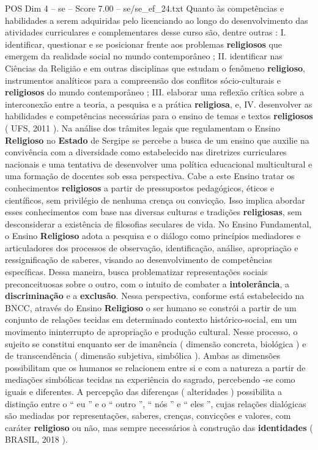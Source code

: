 \begin{textsample}{POS Dim 4 – se – Score 7.00 – se/se\_ef\_24.txt}
Quanto às competências e habilidades a serem adquiridas pelo licenciando ao longo do desenvolvimento das atividades curriculares e complementares desse curso são, dentre outras : I. identificar, questionar e se posicionar frente aos problemas \textbf{religiosos} que emergem da realidade social no mundo contemporâneo ; II. identificar nas Ciências da Religião e em outras disciplinas que estudam o fenômeno \textbf{religioso}, instrumentos analíticos para a compreensão dos conflitos sócio-culturais e \textbf{religiosos} do mundo contemporâneo ; III. elaborar uma reflexão crítica sobre a interconexão entre a teoria, a pesquisa e a prática \textbf{religiosa}, e, IV. desenvolver as habilidades e competências necessárias para o ensino de temas e textos \textbf{religiosos} ( UFS, 2011 ).
Na análise dos trâmites legais que regulamentam o Ensino \textbf{Religioso} no \textbf{Estado} de Sergipe se percebe a busca de um ensino que auxilie na convivência com a diversidade como estabelecido nas diretrizes curriculares nacionais e uma tentativa de desenvolver uma política educacional multicultural e uma formação de docentes sob essa perspectiva.
Cabe a este Ensino tratar os conhecimentos \textbf{religiosos} a partir de pressupostos pedagógicos, éticos e científicos, sem privilégio de nenhuma crença ou convicção.
Isso implica abordar esses conhecimentos com base nas diversas culturas e tradições \textbf{religiosas}, sem desconsiderar a existência de filosofias seculares de vida.
No Ensino Fundamental, o Ensino \textbf{Religioso} adota a pesquisa e o diálogo como princípios mediadores e articuladores dos processos de observação, identificação, análise, apropriação e ressignificação de saberes, visando ao desenvolvimento de competências específicas.
Dessa maneira, busca problematizar representações sociais preconceituosas sobre o outro, com o intuito de combater a \textbf{intolerância}, a \textbf{discriminação} e a \textbf{exclusão}.
Nessa perspectiva, conforme está estabelecido na BNCC, através do Ensino \textbf{Religioso} o ser humano se constrói a partir de um conjunto de relações tecidas em determinado contexto histórico-social, em um movimento ininterrupto de apropriação e produção cultural.
Nesse processo, o sujeito se constitui enquanto ser de imanência ( dimensão concreta, biológica ) e de transcendência ( dimensão subjetiva, simbólica ).
Ambas as dimensões possibilitam que os humanos se relacionem entre si e com a natureza a partir de mediações simbólicas tecidas na experiência do sagrado, percebendo -se como iguais e diferentes.
A percepção das diferenças ( alteridades ) possibilita a distinção entre o “ eu ” e o “ outro ”, “ nós ” e “ eles ”, cujas relações dialógicas são mediadas por representações, saberes, crenças, convicções e valores, com caráter \textbf{religioso} ou não, mas sempre necessários à construção das \textbf{identidades} ( BRASIL, 2018 ).

\end{textsample}
